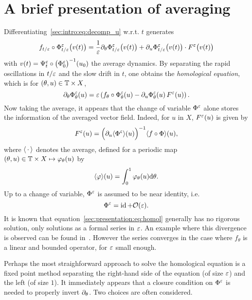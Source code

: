 \section{A brief presentation of averaging} \label{sec:presentation}


Differentiating~\eqref{sec:intro:eq:decomp_u} w.r.t. \( t \) generates
\begin{equation*}
  f_{t/\varepsilon} \circ \Phi^\varepsilon_{t/\varepsilon} \big( v(t) \big) 
  = \frac{1}{\varepsilon} \partial_\theta \Phi^\varepsilon_{t/\varepsilon} \big( v(t) \big)
  + \partial_u \Phi^\varepsilon_{t/\varepsilon}\big( v(t) \big) \cdot F^\varepsilon \big( v(t) \big)
\end{equation*}
with \( v(t) = \Psi^\varepsilon_t \circ \big( \Phi^\varepsilon_0 \big)^{-1} (u_0) \)
the average dynamics. By separating the rapid oscillations in $t/\varepsilon$
and the slow drift in $t$, one obtains the \textit{homological
equation}, which is for $(\theta, u) \in \mathbb{T} \times X$, 
\begin{equation} \label{sec:presentation:eq:homol}
  \partial_\theta \Phi^\varepsilon_{\theta} (u)
  = \varepsilon \left( f_{\theta} \circ \Phi^\varepsilon_{\theta} (u) 
    - \partial_u \Phi^\varepsilon_{\theta} (u) \, F^\varepsilon (u) \right) .
\end{equation}
Now taking the average, it appears that the change of variable $\Phi^\varepsilon$
alone stores the information of the averaged vector field. Indeed, for $u$
in $X$, $F^\varepsilon(u)$ is given by
\begin{equation}
  F^\varepsilon (u) = \Big( \partial_u \langle \Phi^\varepsilon \rangle (u) \Big)^{-1} 
        \langle f \circ \Phi \rangle (u) ,
\end{equation}
where $\langle \,\cdot\, \rangle$ denotes the average, defined for a periodic map
$ (\theta, u) \in \mathbb{T} \times X \mapsto \varphi_\theta(u)$ by
\begin{equation}
  \langle \varphi \rangle (u) = \int_0^1 \varphi_\theta (u) \mathrm{d} \theta .
\end{equation}
Up to a change of variable, $\Phi^\varepsilon$ is assumed to be near identity,
i.e. 
\begin{equation}
  \Phi^\varepsilon = \operatorname{id} + \mathcal{O}(\varepsilon) .
\end{equation}
It is known that equation~\eqref{sec:presentation:eq:homol} generally has no
rigorous solution, only solutions as a formal series in $\varepsilon$. An example
where this divergence is observed can be found
in~\cite{chartier.2010.higher}. However the series converges in the
case where $f_\theta$ is a linear and bounded operator, for $\varepsilon$ small
enough. 

Perhaps the most straighforward approach to solve the homological equation
is a fixed point method separating the right-hand side of the equation (of
size $\varepsilon$) and the left (of size $1$). It immediately appears that a
closure condition on $\Phi^\varepsilon$ is needed to properly invert
$\partial_\theta$. Two choices are often considered.

